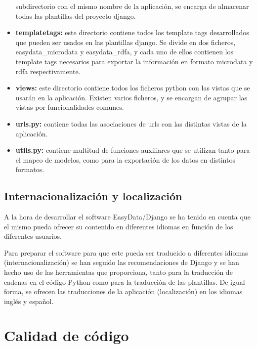 \begin{itemize}
        subdirectorio con el mismo nombre de la aplicación, se encarga de
        almacenar todas las plantillas del proyecto django.
    \item \textbf{templatetags:} este directorio contiene todos los template
        tags desarrollados que pueden ser usados en las plantillas django. Se
        divide en dos ficheros, easydata\_microdata y easydata\_rdfa, y cada
        uno de ellos contienen los template tags necesarios para exportar la
        información en formato microdata y rdfa respectivamente.
    \item \textbf{views:} este directorio contiene todos los ficheros python con
        las vistas que se usarán en la aplicación. Existen varios ficheros, y se
        encargan de agrupar las vistas por funcionalidades comunes.
    \item \textbf{urls.py:} contiene todas las asociaciones de urls con las
        distintas vistas de la aplicación.
    \item \textbf{utils.py:} contiene multitud de funciones auxiliares que se
        utilizan tanto para el mapeo de modelos, como para la exportación de los
        datos en distintos formatos.
\end{itemize}

\subsection{Internacionalización y localización}

A la hora de desarrollar el software EasyData/Django se ha tenido en cuenta que
el mismo pueda ofrecer su contenido en diferentes idiomas en función de los
diferentes usuarios.

Para preparar el software para que este pueda ser traducido a diferentes idiomas
(internacionalización) se han seguido las recomendaciones de Django y se han
hecho uso de las herramientas que proporciona, tanto para la traducción de
cadenas en el código Python como para la traducción de las plantillas. De igual
forma, se ofrecen las traducciones de la aplicación (localización) en los
idiomas inglés y español.

\section{Calidad de código}


